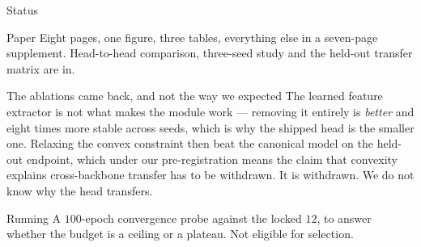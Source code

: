 \documentclass[aspectratio=169]{beamer}
\begin{document}
\begin{frame}{Status}

\begin{block}{Paper}
Eight pages, one figure, three tables, everything else in a seven-page
supplement. Head-to-head comparison, three-seed study and the held-out
transfer matrix are in.
\end{block}

\vspace{0.6em}

\begin{block}{The ablations came back, and not the way we expected}
The learned feature extractor is not what makes the module work --- removing
it entirely is \emph{better} and eight times more stable across seeds, which
is why the shipped head is the smaller one. Relaxing the convex constraint
then beat the canonical model on the held-out endpoint, which under our
pre-registration means the claim that convexity explains cross-backbone
transfer has to be withdrawn. It is withdrawn. We do not know why the head
transfers.
\end{block}

\vspace{0.6em}

\begin{alertblock}{Running}
A $100$-epoch convergence probe against the locked $12$, to answer whether the
budget is a ceiling or a plateau. Not eligible for selection.
\end{alertblock}

\end{frame}
\end{document}
